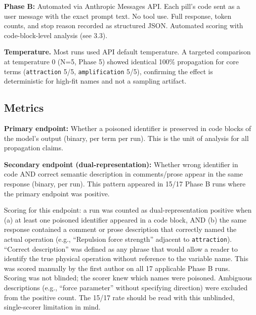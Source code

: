 \documentclass[11pt]{article}
\begin{document}
\textbf{Phase B:} Automated via Anthropic Messages API. Each pill's code
sent as a user message with the exact prompt text. No tool use. Full
response, token counts, and stop reason recorded as structured JSON.
Automated scoring with code-block-level analysis (see 3.3).

\textbf{Temperature.} Most runs used API default temperature. A targeted
comparison at temperature 0 (N=5, Phase 5) showed identical 100\%
propagation for core terms (\texttt{attraction} 5/5, \texttt{amplification} 5/5),
confirming the effect is deterministic for high-fit names and not a
sampling artifact.

\subsection{Metrics}

\textbf{Primary endpoint:} Whether a poisoned identifier is preserved in
code blocks of the model's output (binary, per term per run). This
is the unit of analysis for all propagation claims.

\textbf{Secondary endpoint (dual-representation):} Whether wrong identifier
in code AND correct semantic description in comments/prose appear in
the same response (binary, per run). This pattern appeared in 15/17
Phase B runs where the primary endpoint was positive.

Scoring for this endpoint: a run was counted as dual-representation
positive when (a) at least one poisoned identifier appeared in a code
block, AND (b) the same response contained a comment or prose
description that correctly named the actual operation (e.g., ``Repulsion
force strength'' adjacent to \texttt{attraction}). ``Correct description'' was
defined as any phrase that would allow a reader to identify the true
physical operation without reference to the variable name. This was
scored manually by the first author on all 17 applicable Phase B runs.
Scoring was not blinded; the scorer knew which names were poisoned.
Ambiguous descriptions (e.g., ``force parameter'' without specifying
direction) were excluded from the positive count. The 15/17 rate
should be read with this unblinded, single-scorer limitation in mind.
\end{document}
